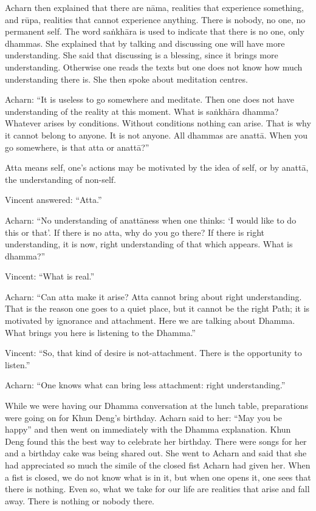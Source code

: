 Acharn then explained that there are nāma, realities that experience something, 
and rūpa, realities that cannot experience anything. There is nobody, no one, no 
permanent self. The word saṅkhāra is used to indicate that there is no one, only 
dhammas. She explained that by talking and discussing one will have more understanding. She said that discussing is a blessing, since it brings more understanding. Otherwise one reads the texts but one does not know how much understanding there is. She then spoke about meditation centres. 

Acharn: ``It is useless to go somewhere and meditate. Then one does not have 
understanding of the reality at this moment. What is saṅkhāra dhamma? Whatever arises by conditions. Without conditions nothing can arise. That is why it 
cannot belong to anyone. It is not anyone. All dhammas are anattā. When you 
go somewhere, is that atta or anattā?'' 

Atta means self, one's actions may be motivated by the idea of self, or by anattā, the understanding of non-self. 

Vincent answered: ``Atta.'' 

Acharn: ``No understanding of anattāness when one thinks: `I would like to do 
this or that'. If there is no atta, why do you go there? If there is right understanding, it is now, right understanding of that which appears. What is 
dhamma?'' 

Vincent: ``What is real.'' 

Acharn: ``Can atta make it arise? Atta cannot bring about right understanding. 
That is the reason one goes to a quiet place, but it cannot be the right Path; it is 
motivated by ignorance and attachment. Here we are talking about Dhamma. 
What brings you here is listening to the Dhamma.'' 

Vincent: ``So, that kind of desire is not-attachment. There is the opportunity to 
listen.'' 

Acharn: ``One knows what can bring less attachment: right understanding.'' 

While we were having our Dhamma conversation at the lunch table, preparations were going on for Khun Deng's birthday. Acharn said to her: ``May you be 
happy'' and then went on immediately with the Dhamma explanation. Khun 
Deng found this the best way to celebrate her birthday. There were songs for her 
and a birthday cake was being shared out. She went to Acharn and said that she 
had appreciated so much the simile of the closed fist Acharn had given her. 
When a fist is closed, we do not know what is in it, but when one opens it, one 
sees that there is nothing. Even so, what we take for our life are realities that 
arise and fall away. There is nothing or nobody there. 

